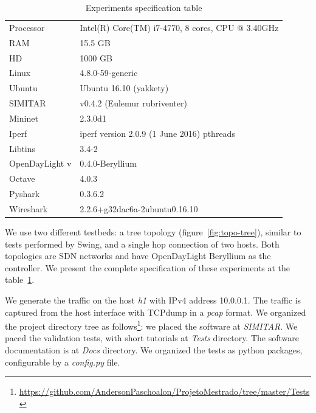 \begin{table}[ht!]
	\centering
	\caption{Experiments specification table}
	\label{tab:specifications}
	\begin{tabular}{ll}
		\hline
		Processor            & Intel(R) Core(TM) i7-4770, 8 cores, CPU @ 3.40GHz \\
		RAM                  & 15.5 GB                                           \\
		HD                   & 1000 GB                                            \\
		Linux         & 4.8.0-59-generic                                  \\
		Ubuntu        & Ubuntu 16.10 (yakkety)                            \\
		SIMITAR       & v0.4.2 (Eulemur rubriventer)                      \\
		Mininet       & 2.3.0d1                                           \\
		Iperf         & iperf version 2.0.9 (1 June 2016) pthreads        \\
		Libtins       & 3.4-2                                             \\
		OpenDayLight v & 0.4.0-Beryllium                                   \\
		Octave        & 4.0.3                                             \\
		Pyshark              & 0.3.6.2                                           \\
		Wireshark            & 2.2.6+g32dac6a-2ubuntu0.16.10                     \\ \hline
	\end{tabular}
\end{table}


We use two different testbeds: a tree topology (figure~\ref{fig:topo-tree}), similar to tests performed by Swing\cite{swing-paper}\cite{background-traffic-matter}\cite{legotg-paper}, and a single hop connection of two hosts. Both topologies are SDN networks and have OpenDayLight Beryllium as the controller.  We present the complete specification of these experiments at the table~\ref{tab:specifications}.
	
We generate the traffic on the host \textit{h1} with IPv4 address 10.0.0.1. The traffic is captured from the host interface with TCPdump in a \textit{pcap} format.  We organized the project directory tree as follows\footnote{ \href{https://github.com/AndersonPaschoalon/ProjetoMestrado/tree/master/Tests}{https://github.com/AndersonPaschoalon/ProjetoMestrado/tree/master/Tests} }: we placed the software at \textit{SIMITAR}. We paced the validation tests, with short tutorials at \textit{Tests} directory. The software documentation is at \textit{Docs} directory. We organized the tests as python packages, configurable by a \textit{config.py} file.


